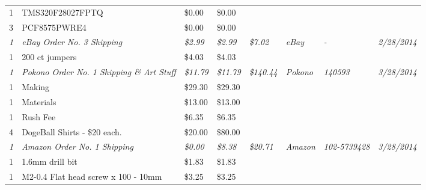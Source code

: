 \begin{table}[h]
{\begin{tabular}{llllllll}
1            & TMS320F28027FPTQ                                  & \$0.00           & \$0.00           &                   &                   &                       &                     \\
3            & PCF8575PWRE4                                      & \$0.00           & \$0.00           &                   &                   &                       &                     \\  \hline \hline
\textit{1}   & \textit{eBay Order No. 3 Shipping}                & \textit{\$2.99}  & \textit{\$2.99}  & \textit{\$7.02}   & \textit{eBay}     & \textit{-}            & \textit{2/28/2014}  \\
1            & 200 ct jumpers                                    & \$4.03           & \$4.03           &                   &                   &                       &                     \\  \hline \hline
\textit{1}   & \textit{Pokono Order No. 1 Shipping \& Art Stuff} & \textit{\$11.79} & \textit{\$11.79} & \textit{\$140.44} & \textit{Pokono}   & \textit{140593}       & \textit{3/28/2014}  \\
1            & Making                                            & \$29.30          & \$29.30          &                   &                   &                       &                     \\
1            & Materials                                         & \$13.00          & \$13.00          &                   &                   &                       &                     \\
1            & Rush Fee                                          & \$6.35           & \$6.35           &                   &                   &                       &                     \\
4            & DogeBall Shirts - \$20 each.                      & \$20.00          & \$80.00          &                   &                   &                       &                     \\  \hline \hline
\textit{1}   & \textit{Amazon Order No. 1 Shipping}              & \textit{\$0.00}  & \textit{\$8.38}  & \textit{\$20.71}  & \textit{Amazon}   & \textit{102-5739428}  & \textit{3/28/2014}  \\
1            & 1.6mm drill bit                                   & \$1.83           & \$1.83           &                   &                   &                       &                     \\
1            & M2-0.4 Flat head screw x 100 - 10mm               & \$3.25           & \$3.25           &                   &                   &                       &                     \\

\end{tabular}}
\end{table}
